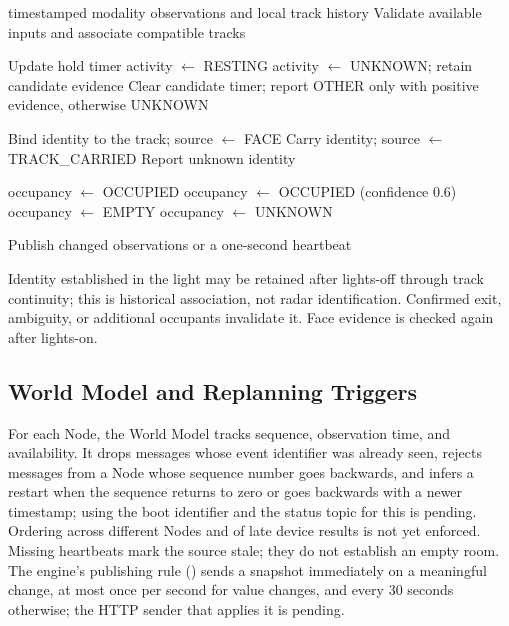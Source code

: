 \documentclass[conference]{IEEEtran}
\newcommand{\fld}[1]{\texttt{\detokenize{#1}}}
\begin{document}
\begin{algorithm}[!tbp]
\caption{Local observation update}
\label{alg:node}
\footnotesize
\begin{algorithmic}[1]
\Require timestamped modality observations and local track history
\State Validate available inputs and associate compatible tracks

  \State Update hold timer
    \State activity $\gets$ RESTING
  \Else
    \State activity $\gets$ UNKNOWN; retain candidate evidence
  \EndIf
\Else
  \State Clear candidate timer; report OTHER only with positive
  evidence, otherwise UNKNOWN
\EndIf

  \State Bind identity to the track; source $\gets$ FACE
  \State Carry identity; source $\gets$ TRACK\_CARRIED
\Else
  \State Report unknown identity
\EndIf

  \State occupancy $\gets$ OCCUPIED
  \State occupancy $\gets$ OCCUPIED (confidence 0.6)
  \State occupancy $\gets$ EMPTY
\Else
  \State occupancy $\gets$ UNKNOWN
\EndIf

\State Publish changed observations or a one-second heartbeat
\end{algorithmic}
\end{algorithm}

Identity established in the light may be retained after lights-off
through track continuity; this is historical association, not radar
identification. Confirmed exit, ambiguity, or additional occupants
invalidate it. Face evidence is checked again after lights-on.

\subsection{World Model and Replanning Triggers}
\label{sec:world}

For each Node, the World Model tracks sequence, observation time,
and availability. It drops messages whose event identifier was
already seen, rejects messages from a Node whose sequence number goes
backwards, and infers a restart when the sequence returns to zero or
goes backwards with a newer timestamp; using the boot identifier and
the status topic for this is pending. Ordering across different Nodes
and of late device results is not yet enforced. Missing heartbeats mark the source
stale; they do not establish an empty room. The engine's publishing
rule (\fld{poll()}) sends a snapshot immediately on a meaningful
change, at most once per second for value changes, and every 30
seconds otherwise; the HTTP sender that applies it is pending.
\end{document}
